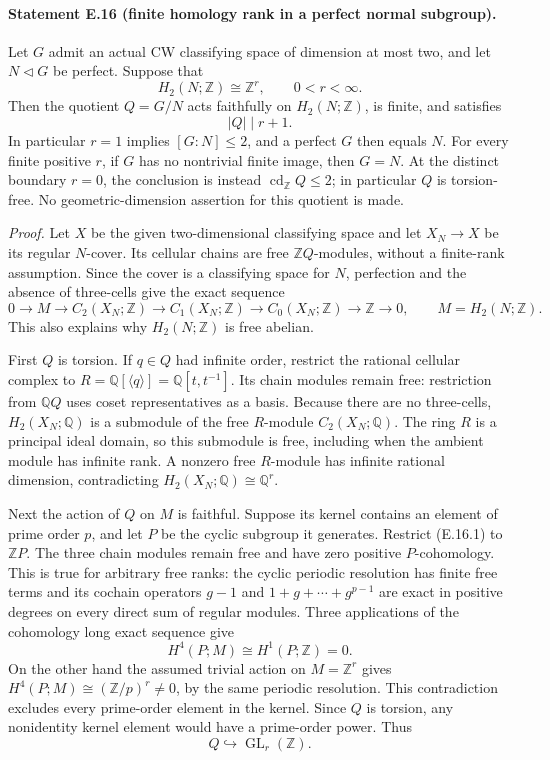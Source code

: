 \paragraph{Statement E.16 (finite homology rank in a perfect normal subgroup).}
Let $G$ admit an actual CW classifying space of dimension at most two,
and let $N\triangleleft G$ be perfect. Suppose that
\[
 H_2(N;\mathbb Z)\cong\mathbb Z^r,
 \qquad 0<r<\infty.
\]
Then the quotient $Q=G/N$ acts faithfully on $H_2(N;\mathbb Z)$,
is finite, and satisfies
\[
                         |Q|\mid r+1.
\]
In particular $r=1$ implies $[G:N]\leq2$, and a perfect $G$ then
equals $N$. For every finite positive $r$, if $G$ has no nontrivial
finite image, then $G=N$. At the distinct boundary $r=0$, the
conclusion is instead $\operatorname{cd}_{\mathbb Z}Q\leq2$;
in particular $Q$ is torsion-free. No geometric-dimension assertion
for this quotient is made.

\emph{Proof.}
Let $X$ be the given two-dimensional classifying space and let
$X_N\to X$ be its regular $N$-cover. Its cellular chains are free
$\mathbb ZQ$-modules, without a finite-rank assumption. Since the
cover is a classifying space for $N$, perfection and the absence
of three-cells give the exact sequence
\[
 0\longrightarrow M\longrightarrow C_2(X_N;\mathbb Z)
 \longrightarrow C_1(X_N;\mathbb Z)
 \longrightarrow C_0(X_N;\mathbb Z)
 \longrightarrow\mathbb Z\longrightarrow0,
 \qquad M=H_2(N;\mathbb Z).
 \tag{E.16.1}
\]
This also explains why $H_2(N;\mathbb Z)$ is free abelian.

First $Q$ is torsion. If $q\in Q$ had infinite order, restrict
the rational cellular complex to
$R=\mathbb Q[\langle q\rangle]=\mathbb Q[t,t^{-1}]$.
Its chain modules remain free: restriction from $\mathbb Q Q$
uses coset representatives as a basis. Because there are no
three-cells, $H_2(X_N;\mathbb Q)$ is a submodule of the free
$R$-module $C_2(X_N;\mathbb Q)$. The ring $R$ is a principal
ideal domain, so this submodule is free, including when the
ambient module has infinite rank. A nonzero free $R$-module
has infinite rational dimension, contradicting
$H_2(X_N;\mathbb Q)\cong\mathbb Q^r$.

Next the action of $Q$ on $M$ is faithful. Suppose its kernel
contains an element of prime order $p$, and let $P$ be the
cyclic subgroup it generates. Restrict (E.16.1) to $\mathbb ZP$.
The three chain modules remain free and have zero positive
$P$-cohomology. This is true for arbitrary free ranks: the
cyclic periodic resolution has finite free terms and its
cochain operators $g-1$ and $1+g+\cdots+g^{p-1}$ are exact
in positive degrees on every direct sum of regular modules.
Three applications of the cohomology long exact sequence give
\[
 H^4(P;M)\cong H^1(P;\mathbb Z)=0.
\]
On the other hand the assumed trivial action on $M=\mathbb Z^r$
gives $H^4(P;M)\cong(\mathbb Z/p)^r\ne0$, by the same periodic
resolution. This contradiction excludes every prime-order
element in the kernel. Since $Q$ is torsion, any nonidentity
kernel element would have a prime-order power. Thus
\[
                       Q\hookrightarrow\operatorname{GL}_r(\mathbb Z).
\]

